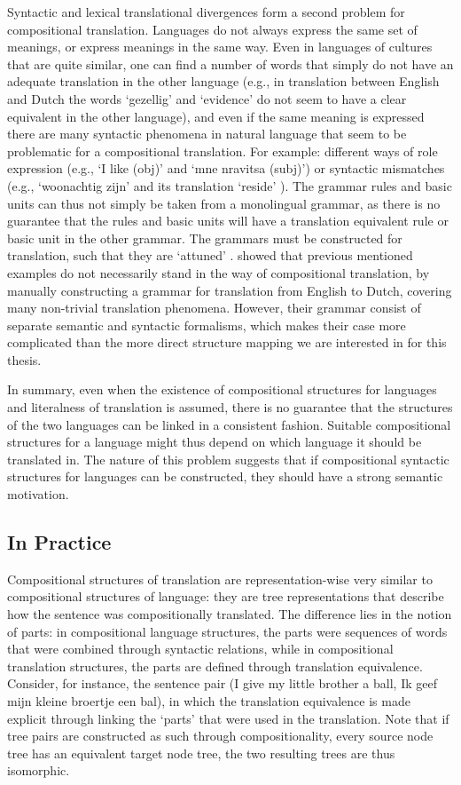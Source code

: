 \documentclass{report}
\newcommand\textcyr[1]{{\fontencoding{OT2}\fontfamily{wncyr}\selectfont #1}}
\theoremstyle{definition}
\theoremstyle{plain}
\begin{document}
Syntactic and lexical translational divergences form a second problem for compositional translation. Languages do not always express the same set of meanings, or express meanings in the same way. Even in languages of cultures that are quite similar, one can find a number of words that simply do not have an adequate translation in the other language (e.g., in translation between English and Dutch the words `gezellig' and `evidence' do not seem to have a clear equivalent in the other language), and even if the same meaning is expressed there are many syntactic phenomena in natural language that seem to be problematic for a compositional translation.  For example: different ways of role expression (e.g., `I like (obj)' and `\textcyr{mne nravitsa (subj)}') or syntactic mismatches (e.g., `woonachtig zijn' and its translation `reside' \citep{landsbergen1989power}).  The grammar rules and basic units can thus not simply be taken from a monolingual grammar, as there is no guarantee that the rules and basic units will have a translation equivalent rule or basic unit in the other grammar. The grammars must be constructed for translation, such that they are `attuned' \citep{rosetta1994compositional}. \cite{rosetta1994compositional} showed that previous mentioned examples do not necessarily stand in the way of compositional translation, by manually constructing a grammar for translation from English to Dutch, covering many non-trivial translation phenomena. However, their grammar consist of separate semantic and syntactic formalisms, which makes their case more complicated than the more direct structure mapping we are interested in for this thesis.

In summary, even when the existence of compositional structures for languages and literalness of translation is assumed, there is no guarantee that the structures of the two languages can be linked in a consistent fashion. Suitable compositional structures for a language might thus depend on which language it should be translated in. The nature of this problem suggests that if compositional syntactic structures for languages  can be constructed, they should have a strong semantic motivation.

\subsection{In Practice}

Compositional structures of translation are representation-wise very similar to compositional structures of language: they are tree representations that describe how the sentence was compositionally translated. The difference lies in the notion of parts: in compositional language structures, the parts were sequences of words that were combined through syntactic relations, while in compositional translation structures, the parts are defined through translation equivalence. Consider, for instance, the sentence pair (I give my little brother a ball, Ik geef mijn kleine broertje een bal), in which the translation equivalence is made explicit through linking the `parts' that were used in the translation. Note that if tree pairs are constructed as such through compositionality, every source node tree has an equivalent target node tree, the two resulting trees are thus isomorphic.
\end{document}
